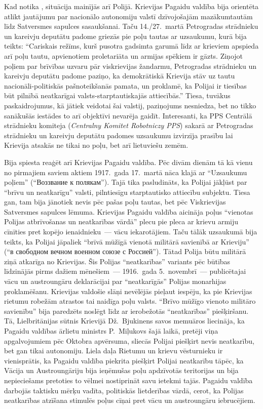 \documentclass[twoside,a5paper,12pt,fleqn,openany]{extbook}
\newcommand{\pltxti}[1]{\textit{\textpolish{#1}}}
\newcommand{\rutxti}[1]{\textrussian{#1}}
\begin{document}
Kad  notika , situācija mainījās arī Polijā. Krievijas Pagaidu valdība bija orientēta atlikt jautājumu par nacionālo autonomiju valstī dzīvojošajām mazākumtautām līdz Satversmes sapulces sasaukšanai. Taču 14./27.~martā Petrogradas strādnieku un kareivju deputātu padome griezās pie poļu tautas ar uzsaukumu, kurā bija teikts: ``Cariskais režīms, kurš pusotra gadsimta garumā līdz ar krieviem apspieda arī poļu tautu, apvienotiem proletariāta un armijas spēkiem ir gāzts. Ziņojot poļiem par brīvības uzvaru pār viskrievijas žandarmu, Petrogradas strādnieku un kareivju deputātu padome paziņo, ka demokrātiskā Krievija stāv uz tautu nacionāli-politiskās pašnoteikšanās pamata, un proklamē, ka Polijai ir tiesības būt pilnībā neatkarīgai valsts-starptautiskajās attiecībās.'' Tiesa, tuvākus paskaidrojumus, kā jātiek veidotai šai valstij, paziņojums nesniedza, bet no tikko sanākušās iestādes to arī objektīvi nevarēja gaidīt. Interesanti, ka PPS Centrālā strādnieku komiteja (\pltxti{Centralny Komitet Robotniczy PPS}) sakarā ar Petrogradas strādnieku un kareivju deputātu padomes uzsaukumu izvirzīja prasību lai Krievija atsakās ne tikai no poļu, bet arī lietuviešu zemēm.

Bija spiesta reaģēt arī Krievijas Pagaidu valdība. Pēc divām dienām tā kā vienu no pirmajiem saviem aktiem 1917.~gada 17.~martā nāca klajā ar ``Uzsaukumu poļiem'' (``\rutxti{Воззвание к полякам}''). Tajā tika pasludināts, ka Polijai jākļūst par ``brīvu un neatkarīgu'' valsti, pilntiesīgu starptautisko attiecību subjektu. Tiesa gan, tam bija jānotiek nevis pēc pašas poļu tautas, bet pēc Viskrievijas Satversmes sapulces lēmuma. Krievijas Pagaidu valdība aicināja poļus ``vienotas Polijas atbrīvošanas un neatkarības vārdā'' plecu pie pleca ar krievu armiju cīnīties pret kopējo ienaidnieku~--- vācu iekarotājiem. Taču tālāk uzsaukumā bija teikts, ka Polijai jāpaliek ``brīvā mūžīgā vienotā militārā savienībā ar Krieviju'' (``\rutxti{в свободном вечном военном союзе с Россией}''). Tātad Polija būtu militārā ziņā atkarīga no Krievijas. Šis Polijas ``neatkarības'' variants pēc būtības līdzinājās pirms dažiem mēnešiem~--- 1916.~gada 5.~novembrī~--- publicētajai vācu un austroungāru deklarācijai par ``neatkarīgās'' Polijas monarhijas proklamēšanu. Krievijas valdošie slāņi nevēlējās pieļaut iespēju, ka pie Krievijas rietumu robežām atrastos tai naidīga poļu valsts. ``Brīvo mūžīgo vienoto militāro savienību'' bija paredzēts noslēgt līdz ar ierobežotās ``neatkarības'' piešķiršanu. Tā, Lielbritānijas sūtnis Krievijā Dž.~Bjukinens savos memuāros liecināja, ka Pagaidu valdības ārlietu ministrs P.~Miļukovs šajā laikā, pretēji viņa apgalvojumiem pēc Oktobra apvērsuma, sliecās Polijai piešķirt nevis neatkarību, bet gan tikai autonomiju. Liela daļa Rietumu un krievu vēsturnieku ir vienisprātis, ka Pagaidu valdība piekrita piešķirt Polijai neatkarību tāpēc, ka Vācija un Austroungāriju bija ieņēmušas poļu apdzīvotās teritorijas un bija nepieciešams pretoties to vēlmei nostiprināt savu ietekmi tajās. Pagaidu valdība darbojās taktisku mērķu vadīta, politiskās lietderības vārdā, cerot, ka Polijas neatkarības atzīšana stimulēs poļus cīņai pret vācu un austroungāru iebrucējiem.
\end{document}
